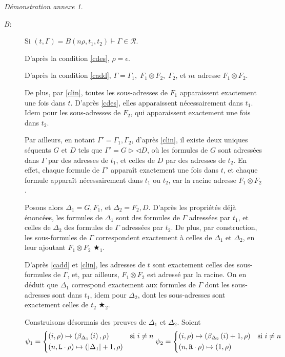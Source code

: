 \documentclass[11pt,a4paper]{article}
\theoremstyle{plain}
\theoremstyle{definition}
\theoremstyle{remark}
\newtheorem{demonstrationappendix}{Démonstration annexe}
\newcommand*{\tensor}{\otimes}
\newcommand*{\someadd}{\rho}
\newcommand*{\sequent}{\Gamma}
\newcommand*{\sequentbis}{\Delta}
\newcommand*{\Left}{\textnormal{\texttt{L}}}
\newcommand*{\Right}{\textnormal{\texttt{R}}}
\newcommand*{\representations}{\ensuremath{\mathcal{R}}}
\newcommand*{\setshuffle}{\triangleright \triangleleft}
\begin{document}
\begin{demonstrationappendix}
\begin{description}
        \item[$B$:] Si $(t, \sequent) = B(n\rho, t_1, t_2) \vdash \sequent \in \representations$.
    
        D'après la condition \ref{cdes}, $\rho = \epsilon$.
    
        D'après la condition \ref{cadd}, $\sequent = \sequent_1, \; F_1 \tensor F_2, \; \sequent_2$, et $n\epsilon$ adresse $F_1 \tensor F_2$. 
    
        De plus, par \ref{clin}, toutes les sous-adresses de $F_1$ apparaissent exactement une fois dans $t$. D'après \ref{cdes}, elles apparaissent nécessairement dans $t_1$. Idem pour les sous-adresses de $F_2$, qui apparaissent exactement une fois dans $t_2$.
    
        Par ailleurs, en notant $\sequent' = \sequent_1, \sequent_2$, d'après \ref{clin}, il existe deux uniques séquents $G$ et $D$ tels que $\sequent' = G \setshuffle  D$, où les formules de $G$ sont adressées dans $\sequent$ par des adresses de $t_1$, et celles de $D$ par des adresses de $t_2$. En effet, chaque formule de $\sequent'$ apparaît exactement une fois dans $t$, et chaque formule apparaît nécessairement dans $t_1$ ou $t_2$, car la racine adresse $F_1 \tensor F_2$.
    
        Posons alors $\sequentbis_1 = G, F_1$, et $\sequentbis_2 = F_2, D$. D'après les propriétés déjà énoncées, les formules de $\sequentbis_1$ sont des formules de $\sequent$ adressées par $t_1$, et celles de $\sequentbis_2$ des formules de $\sequent$ adressées par $t_2$. De plus, par construction, les sous-formules de $\sequent$ correspondent exactement à celles de $\sequentbis_1$ et $\sequentbis_2$, en leur ajoutant $F_1 \tensor F_2$ $\bigstar_1$.
        
        D'après \ref{cadd} et \ref{clin}, les adresses de $t$ sont exactement celles des sous-formules de $\sequent$, et, par ailleurs, $F_1 \tensor F_2$ est adressé par la racine. On en déduit que $\sequentbis_1$ correspond exactement aux formules de $\sequent$ dont les sous-adresses sont dans $t_1$, idem pour $\sequentbis_2$, dont les sous-adresses sont exactement celles de $t_2$ $\bigstar_2$.
    
        Construisons désormais des preuves de $\sequentbis_1$ et $\sequentbis_2$. Soient
        \begin{equation*}
            \psi_1 = 
            \begin{cases*}
                (i, \someadd) \mapsto (\beta_{\sequentbis_1} \left( i \right), \someadd) & si $i \neq n$\\
                (n, \Left \cdot \someadd) \mapsto (| \sequentbis_1 | + 1, \someadd)
            \end{cases*}
            \psi_2 = 
            \begin{cases*}
                (i, \someadd) \mapsto (\beta_{\sequentbis_2} \left( i \right) + 1, \someadd) & si $i \neq n$\\
                (n, \Right \cdot \someadd) \mapsto (1, \someadd)
            \end{cases*} 
        \end{equation*}
    

\end{description}
\end{demonstrationappendix}
\end{document}
